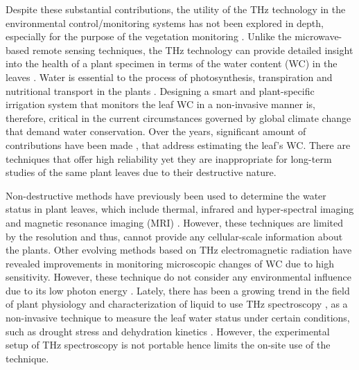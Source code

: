 \documentclass[journal,article,submit,moreauthors,pdftex]{Definitions/mdpi}
\renewcommand{\^}{\hat}  %
\begin{document}
Despite these substantial contributions, the utility of the THz technology in the environmental control/monitoring systems has not been explored in depth, especially for the purpose of the vegetation monitoring \cite{Zahid2018,Davy2017}. Unlike the microwave-based remote sensing techniques, the THz technology can provide detailed insight into the health of a plant specimen in terms of the water content (WC) in the leaves \cite{Santesteban2015}. Water is essential to the process of photosynthesis, transpiration and nutritional transport in the plants \cite{Torres2016}. Designing a smart and plant-specific irrigation system that monitors the leaf WC in a non-invasive manner is, therefore, critical in the current circumstances governed by global climate change that demand water conservation. Over the years, significant amount of contributions have been made \cite{Davy2017,Torres2016,Santesteban2015,Jordens2009,Gente}, that address estimating the leaf's WC. There are techniques that offer high reliability yet they are inappropriate for long-term studies of the same plant leaves \cite{Gente,Gente2015,Born2014,Breitenstein2011,Nie2017} due to their destructive nature.

Non-destructive methods have previously been used to determine the water status in plant leaves, which include thermal, infrared and hyper-spectral imaging and magnetic resonance imaging (MRI) \cite{Song2018}. However, these techniques are limited by the resolution and thus, cannot provide any cellular-scale information about the plants. Other evolving methods based on THz electromagnetic radiation have revealed improvements in monitoring microscopic changes of WC due to high sensitivity\cite{Song2018,Gente2015}. However, these technique do not consider any environmental influence due to its low photon energy \cite{Song2018,Gente2015}. Lately, there has been a growing trend in the field of plant physiology and characterization of liquid to use THz spectroscopy \cite{David2012}, as a non-invasive technique to measure the leaf water status under certain conditions, such as drought stress\cite{Jordens2009,Gente,Born2014,Hadjiloucas1999,Ugo2012} and dehydration kinetics  \cite{Song2018}. However, the experimental setup of THz spectroscopy is not portable hence limits the on-site use of the technique.
\end{document}
